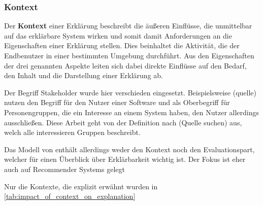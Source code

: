 \subsubsection{Kontext}

Der \textbf{Kontext} einer Erklärung beschreibt die äußeren Einflüsse, die unmittelbar auf das erklärbare System wirken und somit damit Anforderungen an die Eigenschaften einer Erklärung stellen. Dies beinhaltet die Aktivität, die der Endbenutzer in einer bestimmten Umgebung durchführt. Aus den Eigenschaften der drei genannten Aspekte leiten sich dabei direkte Einflüsse auf den Bedarf, den Inhalt und die Darstellung einer Erklärung ab.

Der Begriff Stakeholder wurde hier verschieden eingesetzt. Beispielsweise (quelle) nutzen den Begriff für den Nutzer einer Software und \cite{nunes_systematic_2017} als Oberbegriff für Personengruppen, die ein Interesse an einem System haben, den Nutzer allerdings ausschließen. Diese Arbeit geht von der Definition nach (Quelle suchen) aus, welch alle interessieren Gruppen beschreibt. 

Das Modell von \cite{nunes_systematic_2017} enthält allerdings weder den Kontext noch den Evaluationspart, welcher für einen Überblick über Erklärbarkeit wichtig ist. Der Fokus ist eher auch auf Recommender Systems gelegt

Nur die Kontexte, die explizit erwähnt wurden in \autoref{tab:impact_of_context_on_explanation}

